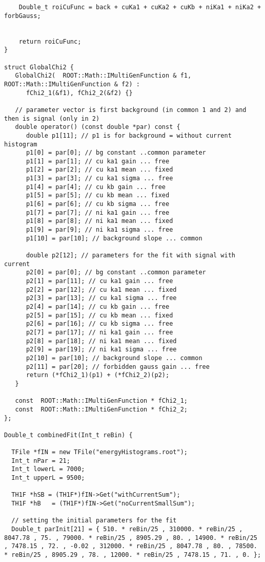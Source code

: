\begin{appendices}
\begin{lstlisting}
    Double_t roiCuFunc = back + cuKa1 + cuKa2 + cuKb + niKa1 + niKa2 + forbGauss;
    
   
    return roiCuFunc;    
}

struct GlobalChi2 { 
   GlobalChi2(  ROOT::Math::IMultiGenFunction & f1,  ROOT::Math::IMultiGenFunction & f2) : 
      fChi2_1(&f1), fChi2_2(&f2) {}

   // parameter vector is first background (in common 1 and 2) and then is signal (only in 2)
   double operator() (const double *par) const {
      double p1[11]; // p1 is for background = without current histogram
      p1[0] = par[0]; // bg constant ..common parameter
      p1[1] = par[1]; // cu ka1 gain ... free 
      p1[2] = par[2]; // cu ka1 mean ... fixed 
      p1[3] = par[3]; // cu ka1 sigma ... free 
      p1[4] = par[4]; // cu kb gain ... free
      p1[5] = par[5]; // cu kb mean ... fixed
      p1[6] = par[6]; // cu kb sigma ... free
      p1[7] = par[7]; // ni ka1 gain ... free
      p1[8] = par[8]; // ni ka1 mean ... fixed
      p1[9] = par[9]; // ni ka1 sigma ... free
      p1[10] = par[10]; // background slope ... common

      double p2[12]; // parameters for the fit with signal with current 
      p2[0] = par[0]; // bg constant ..common parameter
      p2[1] = par[11]; // cu ka1 gain ... free 
      p2[2] = par[12]; // cu ka1 mean ... fixed 
      p2[3] = par[13]; // cu ka1 sigma ... free 
      p2[4] = par[14]; // cu kb gain ... free
      p2[5] = par[15]; // cu kb mean ... fixed
      p2[6] = par[16]; // cu kb sigma ... free
      p2[7] = par[17]; // ni ka1 gain ... free
      p2[8] = par[18]; // ni ka1 mean ... fixed
      p2[9] = par[19]; // ni ka1 sigma ... free
      p2[10] = par[10]; // background slope ... common
      p2[11] = par[20]; // forbidden gauss gain ... free
      return (*fChi2_1)(p1) + (*fChi2_2)(p2);
   } 

   const  ROOT::Math::IMultiGenFunction * fChi2_1;
   const  ROOT::Math::IMultiGenFunction * fChi2_2;
};

Double_t combinedFit(Int_t reBin) { 

  TFile *fIN = new TFile("energyHistograms.root");
  Int_t nPar = 21;
  Int_t lowerL = 7000;
  Int_t upperL = 9500;
  
  TH1F *hSB = (TH1F*)fIN->Get("withCurrentSum");
  TH1F *hB   = (TH1F*)fIN->Get("noCurrentSmallSum"); 
  
  // setting the initial parameters for the fit
  Double_t parInit[21] = { 510. * reBin/25 , 310000. * reBin/25 , 8047.78 , 75. , 79000. * reBin/25 , 8905.29 , 80. , 14900. * reBin/25 , 7478.15 , 72. , -0.02 , 312000. * reBin/25 , 8047.78 , 80. , 78500. * reBin/25 , 8905.29 , 78. , 12000. * reBin/25 , 7478.15 , 71. , 0. }; 


\end{lstlisting}
\end{appendices}
